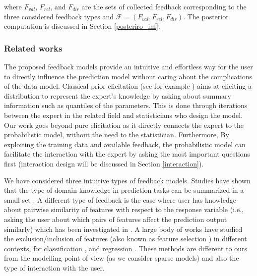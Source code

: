 \documentclass[dissertation,math,vertlayout,pdfa,colorlinks]{aaltoseries}
\newcommand{\bF}{\mathcal{F}}
\begin{document}
\noindent where $F_{val}$, $F_{rel}$, and $F_{dir}$ are the sets of collected feedback corresponding to the three considered feedback types and $\bF = (F_{val}, F_{rel}, F_{dir})$. The posterior computation is discussed in Section \ref{posteriro_inf}.




\subsubsection{Related works}

The proposed feedback models provide an intuitive and effortless way for the user to directly influence the prediction model without caring about the complications of the data model. Classical prior elicitation (see for example \cite{OHagan06,garthwaite2005statistical}) aims at eliciting a distribution to represent the expert's knowledge by asking about summary information such as quantiles of the parameters. This is done through iterations between the expert in the related field and statisticians who design the model. Our work goes beyond pure elicitation as it directly connects the expert to the probabilistic model, without the need to the statistician. Furthermore, By exploiting the training data and available feedback, the probabilistic model can facilitate the interaction with the expert by asking the most important questions first (interaction design will be discussed in Section \ref{interaction}).

We have considered three intuitive types of feedback models. Studies have shown that the type of domain knowledge in prediction tasks can be summarized in a small set \cite{concept_driven_CHI2019}. A different type of feedback is the case where user has knowledge about pairwise similarity of features with respect to the response variable (i.e., asking the user about which  pairs of features affect the prediction output similarly) which has been investigated in \cite{Homayun_pairwise_UMAP,Homayun_pairwise_ijcai2019}. A large body of works have studied the exclusion/inclusion of features (also known as feature selection \cite{Correia2019HumanintheLoopFS}) in different contexts, for classification  \cite{raghavan2006active,druck2009active,settles2011closing}, and regression \cite{Micallef_elicitation}. These methods are different to ours from the modelling point of view (as we consider sparse models) and also the type of interaction with the user.   
\end{document}
